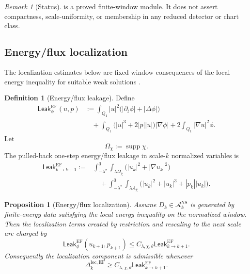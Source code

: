 \documentclass[11pt]{article}
\numberwithin{equation}{section}
\theoremstyle{plain}
\newtheorem{proposition}[theorem]{Proposition}
\theoremstyle{definition}
\newtheorem{definition}[theorem]{Definition}
\theoremstyle{remark}
\newtheorem{remark}[theorem]{Remark}
\newcommand{\NS}{\mathrm{NS}}
\newcommand{\EF}{\mathrm{EF}}
\newcommand{\Leak}{\mathsf{Leak}}
\newcommand{\A}{\mathcal A}
\begin{document}
\begin{remark}[Status]
 is a proved finite-window module.
It does not assert compactness, scale-uniformity, or membership in any reduced
detector or chart class.
\end{remark}

\subsection{Energy/flux localization}

The localization estimates below are fixed-window consequences of the local energy inequality for suitable weak solutions \cite{Leray1934,Hopf1951,CKN1982}.

\begin{definition}[Energy/flux leakage]\label{def:ef-leakage}
Define
\[
\begin{aligned}
  \Leak_{\phi}^{\EF}(u,p)
  &:=
  \int_{Q_1}|u|^2\bigl(|\partial_t\phi|+|\Delta\phi|\bigr)\\
  &\quad+
  \int_{Q_1}\bigl(|u|^3+2|p||u|\bigr)|\nabla\phi|
  +
  2\int_{Q_1}|\nabla u|^2\phi .
\end{aligned}
\]
Let
\[
  \Omega_\chi:=\operatorname{supp}\chi.
\]
The pulled-back one-step energy/flux leakage in scale-\(k\) normalized
variables is
\[
\begin{aligned}
  \Leak_{k\to k+1}^{\EF}
  :=
  &\int_{-\lambda^2}^{0}\int_{\lambda\Omega_\chi}
  \bigl(|u_k|^2+|\nabla u_k|^2\bigr)\\
  &\quad+
  \int_{-\lambda^2}^{0}\int_{\lambda A_\chi}
  \bigl(|u_k|^2+|u_k|^3+|p_k||u_k|\bigr).
\end{aligned}
\]
\end{definition}

\begin{proposition}[Energy/flux localization]\label{prop:ef-localization}
Assume \(D_k\in\A_k^{\NS}\) is generated by finite-energy data satisfying the
local energy inequality on the normalized window.  Then the localization terms
created by restriction and rescaling to the next scale are charged by
\[
  \Leak_{\phi}^{\EF}(u_{k+1},p_{k+1})
  \le
  C_{\lambda,\chi,\theta}\Leak_{k\to k+1}^{\EF}.
\]
Consequently the localization component is admissible whenever
\[
  \Delta_k^{\mathrm{loc},\EF}
  \ge
  C_{\lambda,\chi,\theta}\Leak_{k\to k+1}^{\EF}.
\]
\end{proposition}
\end{document}
